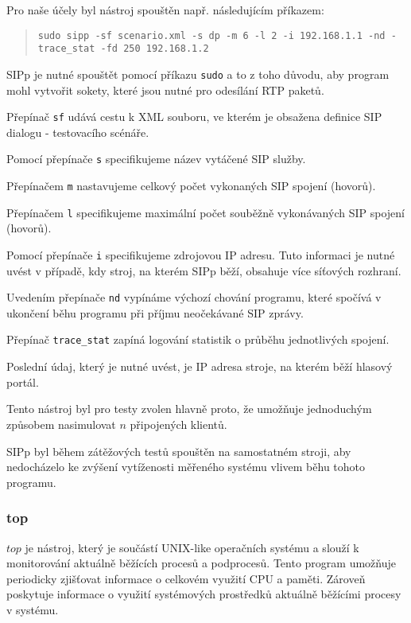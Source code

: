 \documentclass[ing,male,java,dept460,twoside]{diploma}						%
\begin{document}
Pro naše účely byl nástroj spouštěn např. následujícím příkazem:

\begin{quote}
\begin{sloppypar}
	\texttt{sudo sipp -sf scenario.xml -s dp -m 6 -l 2 -i 192.168.1.1 -nd -trace\_stat -fd 250 192.168.1.2}
\end{sloppypar}
\end{quote}

SIPp je nutné spouštět pomocí příkazu \texttt{sudo} a to z toho důvodu, aby program mohl vytvořit sokety, které jsou nutné pro odesílání RTP paketů.

Přepínač \texttt{sf} udává cestu k XML souboru, ve kterém je obsažena definice SIP dialogu - testovacího scénáře.

Pomocí přepínače \texttt{s} specifikujeme název vytáčené SIP služby.

Přepínačem \texttt{m} nastavujeme celkový počet vykonaných SIP spojení (hovorů).

Přepínačem \texttt{l} specifikujeme maximální počet souběžně vykonávaných SIP spojení (hovorů).

Pomocí přepínače \texttt{i} specifikujeme zdrojovou IP adresu. Tuto informaci je nutné uvést v případě, kdy stroj, na kterém SIPp běží, obsahuje více síťových rozhraní.

Uvedením přepínače \texttt{nd} vypínáme výchozí chování programu, které spočívá v ukončení běhu programu při příjmu neočekávané SIP zprávy.

Přepínač \texttt{trace\_stat} zapíná logování statistik o průběhu jednotlivých spojení.

Poslední údaj, který je nutné uvést, je IP adresa stroje, na kterém běží hlasový portál.

Tento nástroj byl pro testy zvolen hlavně proto, že umožňuje jednoduchým způsobem nasimulovat $n$ připojených klientů.

SIPp byl během zátěžových testů spouštěn na samostatném stroji, aby nedocházelo ke zvýšení vytíženosti měřeného systému vlivem běhu tohoto programu.

\subsubsection{top}
$top$ je nástroj, který je součástí UNIX-like operačních systému a slouží k monitorování aktuálně běžících procesů a podprocesů. Tento program umožňuje periodicky zjišťovat informace o celkovém využití CPU a paměti. Zároveň poskytuje informace o využití systémových prostředků aktuálně běžícími procesy v systému.
\end{document}
